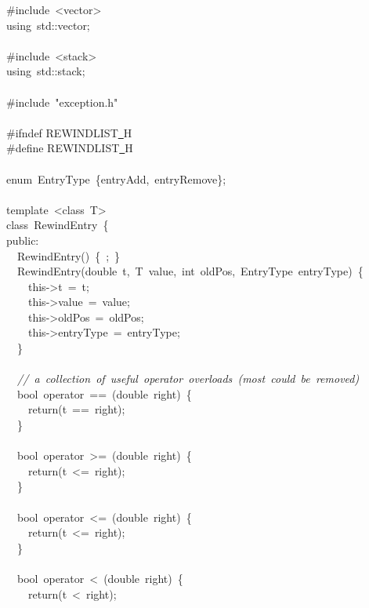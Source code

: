 {\ttfamily \raggedright \small
\#include\ <{}vector>{}\\
using\ std::vector;\\
\ \\
\#include\ <{}stack>{}\\
using\ std::stack;\\
\ \\
\#include\ "{}exception.h"{}\\
\ \\
\#ifndef REWINDLIST\underline\ H\\
\#define REWINDLIST\underline\ H\\
\ \\
enum\ EntryType\ \{entryAdd,\ entryRemove\};\\
\ \\
template\ <{}class\ T>{}\\
class\ RewindEntry\ \{\\
public:\\
\ \ RewindEntry()\ \{\ ;\ \}\\
\ \ RewindEntry(double\ t,\ T\ value,\ int\ oldPos,\ EntryType\ entryType)\ \{\\
\ \ \ \ this-{}>{}t\ =\ t;\\
\ \ \ \ this-{}>{}value\ =\ value;\\
\ \ \ \ this-{}>{}oldPos\ =\ oldPos;\\
\ \ \ \ this-{}>{}entryType\ =\ entryType;\\
\ \ \}\\
\ \\
\ \ \textsl{//\ a\ collection\ of\ useful\ operator\ overloads\ (most\ could\ be\ removed)}\\
\ \ bool\ operator\ ==\ (double\ right)\ \{\\
\ \ \ \ return(t\ ==\ right);\\
\ \ \}\\
\ \\
\ \ bool\ operator\ >{}=\ (double\ right)\ \{\\
\ \ \ \ return(t\ <{}=\ right);\\
\ \ \}\\
\ \\
\ \ bool\ operator\ <{}=\ (double\ right)\ \{\\
\ \ \ \ return(t\ <{}=\ right);\\
\ \ \}\\
\ \\
\ \ bool\ operator\ <{}\ (double\ right)\ \{\\
\ \ \ \ return(t\ <{}\ right);\\
}
